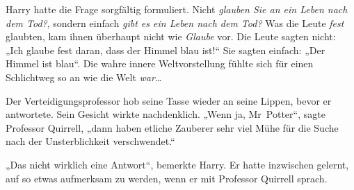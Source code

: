 Harry hatte die Frage sorgfältig formuliert. Nicht \emph{glauben Sie an ein Leben nach dem Tod?}, sondern einfach \emph{gibt es ein Leben nach dem Tod?} Was die Leute \emph{fest} glaubten, kam ihnen überhaupt nicht wie \emph{Glaube} vor. Die Leute sagten nicht: „Ich glaube fest daran, dass der Himmel blau ist!“ Sie sagten einfach: „Der Himmel ist blau“. Die wahre innere Weltvorstellung fühlte sich für einen Schlichtweg so an wie die Welt \emph{war}…

Der Verteidigungsprofessor hob seine Tasse wieder an seine Lippen, bevor er antwortete. Sein Gesicht wirkte nachdenklich. „Wenn ja, Mr~Potter“, sagte Professor Quirrell, „dann haben etliche Zauberer sehr viel Mühe für die Suche nach der Unsterblichkeit verschwendet.“

„Das nicht wirklich eine Antwort“, bemerkte Harry. Er hatte inzwischen gelernt, auf so etwas aufmerksam zu werden, wenn er mit Professor Quirrell sprach.

